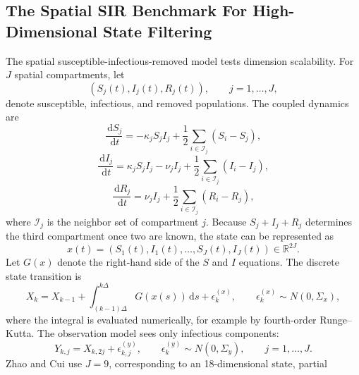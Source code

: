 \documentclass[11pt]{article}
\numberwithin{equation}{section}
\newcommand{\R}{\mathbb R}
\newcommand{\dd}{\,\mathrm d}
\begin{document}
\subsection{The Spatial SIR Benchmark For High-Dimensional State Filtering}

The spatial susceptible-infectious-removed model tests dimension scalability.
For \(J\) spatial compartments, let
\begin{equation}
    (S_j(t),I_j(t),R_j(t)),
    \qquad
    j=1,\ldots,J,
    \label{eq:p27-sir1}
\end{equation}
denote susceptible, infectious, and removed populations.  The coupled dynamics
are
\begin{equation}
    \frac{\dd S_j}{\dd t}
    =
    -\kappa_j S_j I_j
    +
    \frac12
    \sum_{i\in\mathcal I_j}(S_i-S_j),
    \label{eq:p27-sir2}
\end{equation}
\begin{equation}
    \frac{\dd I_j}{\dd t}
    =
    \kappa_j S_j I_j-\nu_j I_j
    +
    \frac12
    \sum_{i\in\mathcal I_j}(I_i-I_j),
    \label{eq:p27-sir3}
\end{equation}
\begin{equation}
    \frac{\dd R_j}{\dd t}
    =
    \nu_j I_j
    +
    \frac12
    \sum_{i\in\mathcal I_j}(R_i-R_j),
    \label{eq:p27-sir4}
\end{equation}
where \(\mathcal I_j\) is the neighbor set of compartment \(j\).  Because
\(S_j+I_j+R_j\) determines the third compartment once two are known, the state
can be represented as
\begin{equation}
    x(t)
    =
    (S_1(t),I_1(t),\ldots,S_J(t),I_J(t))
    \in\R^{2J}.
    \label{eq:p27-sir5}
\end{equation}
Let \(G(x)\) denote the right-hand side of the \(S\) and \(I\) equations.  The
discrete state transition is
\begin{equation}
    X_k
    =
    X_{k-1}
    +
    \int_{(k-1)\Delta}^{k\Delta}
    G(x(s))\dd s
    +
    \epsilon_k^{(x)},
    \qquad
    \epsilon_k^{(x)}\sim N(0,\Sigma_x),
    \label{eq:p27-sir6}
\end{equation}
where the integral is evaluated numerically, for example by fourth-order
Runge--Kutta.  The observation model sees only infectious components:
\begin{equation}
    Y_{k,j}=X_{k,2j}+\epsilon_{k,j}^{(y)},
    \qquad
    \epsilon_k^{(y)}\sim N(0,\Sigma_y),
    \qquad
    j=1,\ldots,J.
    \label{eq:p27-sir7}
\end{equation}
Zhao and Cui use \(J=9\), corresponding to an 18-dimensional state, partial
\end{document}
